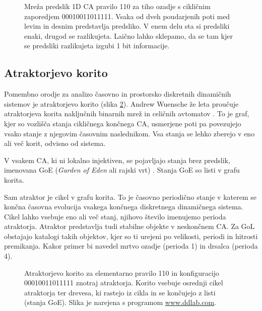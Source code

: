 \documentclass[12pt,a4paper,openany,twoside]{book}
\begin{document}
\begin{figure}[htb]
\centerline{}
\caption[Mreža predslik 1D CA.]
{Mreža predslik 1D CA pravilo 110 za tiho ozadje s cikličnim zaporedjem 00010011011111.
Vsaka od dveh poudarjenih poti med levim in desnim predstavlja predsliko.
V enem delu sta si predsliki enaki, drugod se razlikujeta.
Laično lahko sklepamo, da se tam kjer se predsliki razlikujeta izgubi 1 bit informacije.}
\label{network_rule110_quiescent}
\end{figure}

\subsection{Atraktorjevo korito}

Pomembno orodje za analizo časovno in prostorsko diskretnih dinamičnih sistemov je atraktorjevo korito (slika \ref{basin_of_attraction}).
Andrew Wuensche že leta proučuje atraktorjeva korita naključnih binarnih mrež in celičnih avtomatov \cite{Wuensche1992, WuenscheDDLab}.
To je graf, kjer so vozlišča stanja cikličnega končnega CA,
usmerjene poti pa povezujejo vsako stanje z njegovim časovnim naslednikom.
Vsa stanja se lehko zberejo v eno ali več korit, odvisno od sistema.

V vsakem CA, ki ni lokalno injektiven, se pojavljajo stanja brez predslik, imenovana GoE
(\textit{Garden of Eden} ali rajski vrt) \cite{Moore1962, Myhill1963}.
Stanja GoE so listi v grafu korita.

Sam atraktor je cikel v grafu korita.
To je časovno periodično stanje v katerem se končna časovna evolucija vsakega končnega diskretnega dinamičnega sistema.
Cikel lahko vsebuje eno ali več stanj, njihovo število imenujemo perioda atraktorja.
Atraktor predstavlja tudi stabilne objekte v neskončnem CA.
Za GoL obstajajo katalogi takih objektov, kjer so ti urejeni po velikosti, periodi in hitrosti premikanja.
Kakor primer bi navedel mrtvo ozadje (perioda 1) in drsalca (perioda 4).

\begin{figure}[htb]
\centerline{}
\caption[Atraktorjevo korito.]
{Atraktorjevo korito za elementarno pravilo 110 in konfiguracijo 00010011011111 znotraj atraktorja.
Korito vsebuje osrednji cikel atraktorja ter drevesa, ki rastejo iz cikla in se končujejo z listi (stanja GoE).
Slika je narejena s programom \url{www.ddlab.com}.}
\label{basin_of_attraction}
\end{figure}
\end{document}
